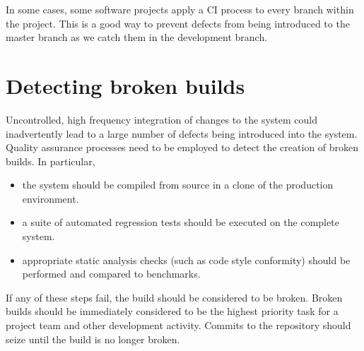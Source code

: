 \documentclass[a4paper, openany]{memoir}
\begin{document}
In some cases, some software projects apply a CI process to every branch within the project. This is a good way to prevent defects from being introduced to the master branch as we catch them in the development branch.

\section{Detecting broken builds}
Uncontrolled, high frequency integration of changes to the system could inadvertently lead to a large number of defects being introduced into the system. Quality assurance processes need to be employed to detect the creation of broken builds. In particular,
\begin{itemize}
    \item the system should be compiled from source in a clone of the production environment.
    \item a suite of automated regression tests should be executed on the complete system. 
    \item appropriate static analysis checks (such as code style conformity) should be performed and compared to benchmarks. 
\end{itemize}

If any of these steps fail, the build should be considered to be broken. Broken builds should be immediately considered to be the highest priority task for a project team and other development activity. Commits to the repository should seize until the build is no longer broken.
\end{document}
